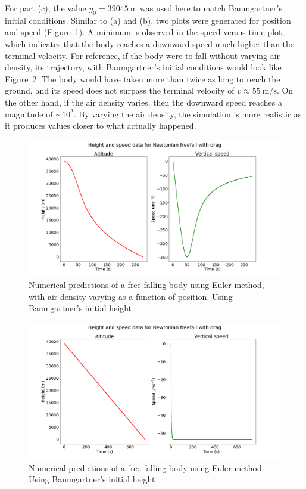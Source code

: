 \documentclass[hyphens,twocolumn,nobalancelastpage,aps,10pt,citeautoscript,longbibliography]{revtex4-2}
\begin{document}
For part (c), the value $y_0 = \qty{39045}{\metre}$ was used here to match
Baumgartner's initial conditions. Similar to (a) and (b), two plots were
generated for position and speed
(Figure~\ref{fig:freefall_numeric_varying_air_density}). A minimum is observed
in the speed versus time plot, which indicates that the body reaches a downward
speed much higher than the terminal velocity. For reference, if the body were
to fall without varying air density, its trajectory, with Baumgartner's initial
conditions would look like Figure~\ref{fig:freefall_numerical_big}. The body
would have taken more than twice as long to reach the ground, and its speed
does not surpass the terminal velocity of $v \approx
	\qty{55}{\metre\per\second}$. On the other hand, if the air density varies,
then the downward speed reaches a magnitude of $\sim 10^2$. By varying the air
density, the simulation is more realistic as it produces values closer to what
actually happened.
\begin{figure}[htpb]
	\centering
	\includegraphics[width=\linewidth]{freefall_numerical_varying_air_density.png}
	\caption{Numerical predictions of a free-falling body using Euler method, with air density varying as a function of position. Using Baumgartner's initial height}%
	\label{fig:freefall_numeric_varying_air_density}
\end{figure}
\begin{figure}[htpb]
	\centering
	\includegraphics[width=\linewidth]{freefall_numerical_big.png}
	\caption{Numerical predictions of a free-falling body using Euler method. Using Baumgartner's initial height}%
	\label{fig:freefall_numerical_big}
\end{figure}
\end{document}
